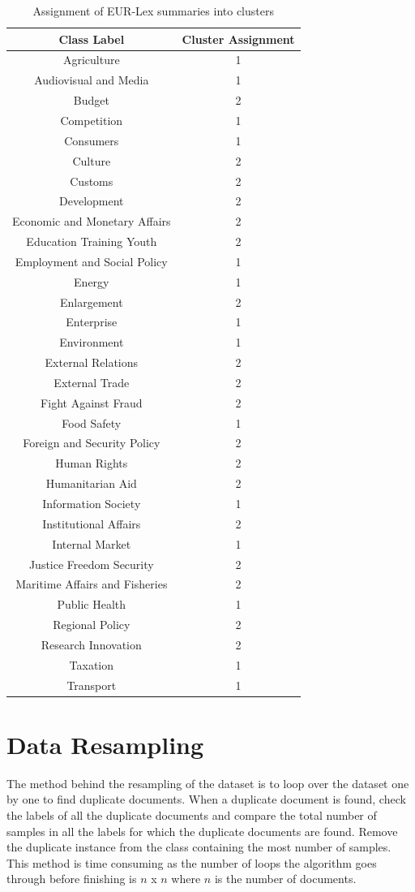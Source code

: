 \begin{table}[!ht]
\centering
\begin{tabular}{cc}
\hline
\textbf{Class Label} & \textbf{Cluster Assignment} \\ \hline
Agriculture & 1 \\ 
Audiovisual and Media & 1 \\ 
Budget & 2 \\ 
Competition & 1 \\ 
Consumers & 1 \\ 
Culture & 2 \\ 
Customs & 2 \\ 
Development & 2 \\ 
Economic and Monetary Affairs & 2 \\ 
Education Training Youth & 2 \\ 
Employment and Social Policy & 1 \\ 
Energy & 1 \\ 
Enlargement & 2 \\ 
Enterprise & 1 \\ 
Environment & 1 \\ 
External Relations & 2 \\ 
External Trade & 2 \\ 
Fight Against Fraud & 2 \\ 
Food Safety & 1 \\ 
Foreign and Security Policy & 2 \\ 
Human Rights & 2 \\ 
Humanitarian Aid & 2 \\ 
Information Society & 1 \\ 
Institutional Affairs & 2 \\ 
Internal Market & 1 \\ 
Justice Freedom Security & 2 \\ 
Maritime Affairs and Fisheries & 2 \\ 
Public Health & 1 \\ 
Regional Policy & 2 \\ 
Research Innovation & 2 \\ 
Taxation & 1 \\ 
Transport & 1 \\ \hline
\end{tabular}
\caption{Assignment of EUR-Lex summaries into clusters}
\label{table:ClusterAssignments32Classes}
\end{table}

\section{Data Resampling} \label{dataResampling}
The method behind the resampling of the dataset is to loop over the dataset one by one to find duplicate documents. When a duplicate document is found, check the labels of all the duplicate documents and compare the total number of samples in all the labels for which the duplicate documents are found. Remove the duplicate instance from the class containing the most number of samples. This method is time consuming as the number of loops the algorithm goes through before finishing is $n$ x $n$ where $n$ is the number of documents.

